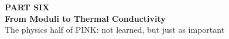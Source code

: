 \documentclass[aspectratio=169]{beamer}
\begin{document}
\begin{dividerframe}
\begin{center}
{\color{LightBlue}\bfseries\sffamily\large PART SIX}\\[8pt]
{\color{white}\bfseries\headingfont\fontsize{30}{36}\selectfont
  From Moduli to Thermal Conductivity}\\[9pt]
{\color{Subtle}\sffamily\normalsize
  The physics half of PINK: not learned, but just as important}
\end{center}
\end{dividerframe}

\end{document}

